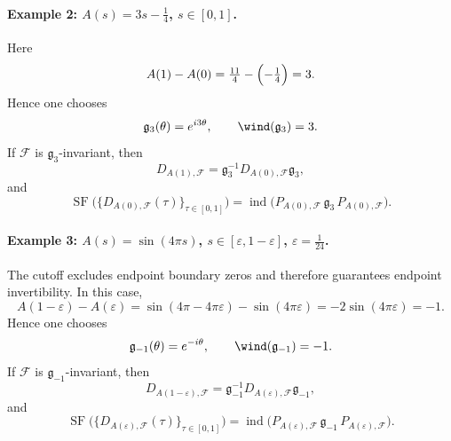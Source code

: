 \documentclass[11pt]{article}
\theoremstyle{definition}
\DeclareMathOperator{\ind}{ind}
\numberwithin{equation}{section}
\begin{document}
\paragraph{Example 2: \(A(s)=3s-\tfrac14\), \(s\in[0,1]\).}
Here
\begin{equation}
A(1)-A(0)=\tfrac{11}{4}-\Bigl(-\tfrac14\Bigr)=3.
\end{equation}
Hence one chooses
\begin{equation}
\mathfrak g_3(\theta)=e^{i3\theta},
\qquad
\wind(\mathfrak g_3)=3.
\end{equation}
If \(\mathcal F\) is \(\mathfrak g_3\)-invariant, then
\begin{equation}
D_{A(1),\mathcal F}
=
\mathfrak g_3^{-1}D_{A(0),\mathcal F}\mathfrak g_3,
\end{equation}
and
\begin{equation}
\operatorname{SF}\bigl(\{D_{A(0),\mathcal F}(\tau)\}_{\tau\in[0,1]}\bigr)
=
\ind\!\bigl(P_{A(0),\mathcal F}\,\mathfrak g_3\,P_{A(0),\mathcal F}\bigr).
\end{equation}

\paragraph{Example 3: \(A(s)=\sin(4\pi s)\), \(s\in[\varepsilon,1-\varepsilon]\), \(\varepsilon=\tfrac1{24}\).}
The cutoff excludes endpoint boundary zeros and therefore guarantees endpoint invertibility. In this case,
\begin{equation}
A(1-\varepsilon)-A(\varepsilon)
=
\sin(4\pi-4\pi\varepsilon)-\sin(4\pi\varepsilon)
=
-2\sin(4\pi\varepsilon)
=
-1.
\end{equation}
Hence one chooses
\begin{equation}
\mathfrak g_{-1}(\theta)=e^{-i\theta},
\qquad
\wind(\mathfrak g_{-1})=-1.
\end{equation}
If \(\mathcal F\) is \(\mathfrak g_{-1}\)-invariant, then
\begin{equation}
D_{A(1-\varepsilon),\mathcal F}
=
\mathfrak g_{-1}^{-1}D_{A(\varepsilon),\mathcal F}\mathfrak g_{-1},
\end{equation}
and
\begin{equation}
\operatorname{SF}\bigl(\{D_{A(\varepsilon),\mathcal F}(\tau)\}_{\tau\in[0,1]}\bigr)
=
\ind\!\bigl(P_{A(\varepsilon),\mathcal F}\,\mathfrak g_{-1}\,P_{A(\varepsilon),\mathcal F}\bigr).
\end{equation}
\end{document}

